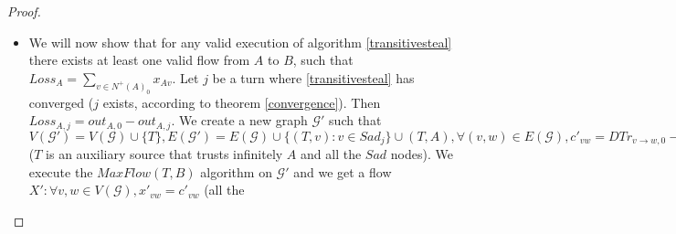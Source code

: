 \documentclass[11pt]{article}
\theoremstyle{definition}
\theoremstyle{corollary}
\theoremstyle{lemma}
\begin{document}
\begin{proof}
\begin{itemize}
          \item We will now show that for any valid execution of algorithm \ref{transitivesteal} there exists at least one
          valid flow from $A$ to $B$, such that $Loss_A = \sum\limits_{v \in N^{+}(A)_0}x_{Av}$. Let $j$ be a turn where
          \ref{transitivesteal} has converged ($j$ exists, according to theorem \ref{convergence}). Then $Loss_{A, j} =
          out_{A, 0} - out_{A, j}$. We create a new graph $\mathcal{G}'$ such that $V(\mathcal{G}') = V(\mathcal{G}) \cup
          \{T\}, E(\mathcal{G}') = E(\mathcal{G}) \cup \{(T, v) : v \in Sad_j\} \cup (T, A), \forall (v, w) \in E(\mathcal{G}),
          c'_{vw} = DTr_{v \rightarrow w, 0} - DTr_{v \rightarrow w, j}, \forall v \in Sad_j, c'_{Tv} = c'_{TA} = \infty$
          ($T$ is an auxiliary source that trusts infinitely $A$ and all the $Sad$ nodes). We execute the $MaxFlow(T, B)$
          algorithm on $\mathcal{G}'$ and we get a flow $X' : \forall v,w \in V(\mathcal{G}), x'_{vw} = c'_{vw}$ (all the

\end{itemize}
\end{proof}
\end{document}
